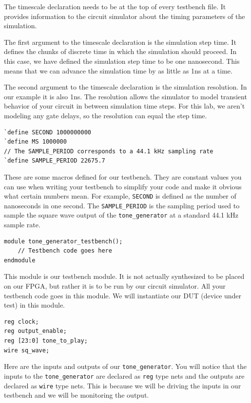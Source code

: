 \documentclass[11pt]{article}
\begin{document}
The timescale declaration needs to be at the top of every testbench file. It provides information to the circuit simulator about the timing parameters of the simulation.

The first argument to the timescale declaration is the simulation step time. It defines the chunks of discrete time in which the simulation should proceed. In this case, we have defined the simulation step time to be one nanosecond. This means that we can advance the simulation time by as little as 1ns at a time.

The second argument to the timescale declaration is the simulation resolution. In our example it is also 1ns. The resolution allows the simulator to model transient behavior of your circuit in between simulation time steps. For this lab, we aren't modeling any gate delays, so the resolution can equal the step time.

\begin{verbatim}
`define SECOND 1000000000
`define MS 1000000
// The SAMPLE_PERIOD corresponds to a 44.1 kHz sampling rate
`define SAMPLE_PERIOD 22675.7
\end{verbatim}

These are some macros defined for our testbench. They are constant values you can use when writing your testbench to simplify your code and make it obvious what certain numbers mean. For example, \verb|SECOND| is defined as the number of nanoseconds in one second. The \verb|SAMPLE_PERIOD| is the sampling period used to sample the square wave output of the \verb|tone_generator| at a standard 44.1 kHz sample rate.

\begin{verbatim}
module tone_generator_testbench();
	// Testbench code goes here
endmodule
\end{verbatim}

This module is our testbench module. It is not actually synthesized to be placed on our FPGA, but rather it is to be run by our circuit simulator. All your testbench code goes in this module. We will instantiate our DUT (device under test) in this module.

\begin{verbatim}
reg clock;
reg output_enable;
reg [23:0] tone_to_play;
wire sq_wave;
\end{verbatim}

Here are the inputs and outputs of our \verb|tone_generator|. You will notice that the inputs to the \verb|tone_generator| are declared as \verb|reg| type nets and the outputs are declared as \verb|wire| type nets. This is because we will be driving the inputs in our testbench and we will be monitoring the output.
\end{document}
